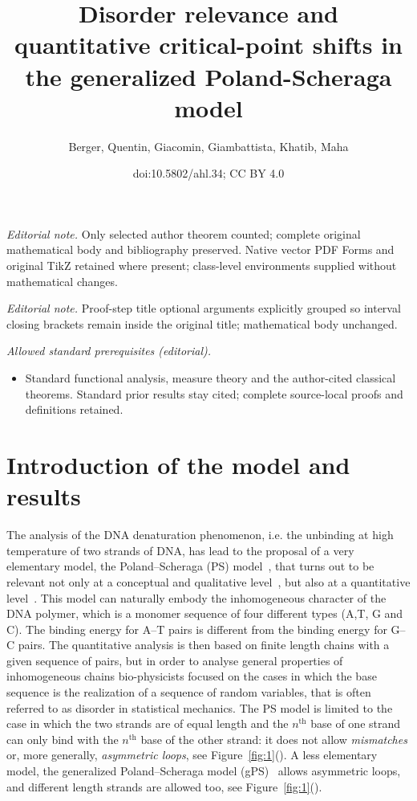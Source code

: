 \documentclass[10pt]{amsart}
\title{Disorder relevance and quantitative critical-point shifts in the generalized Poland-Scheraga model}
\author{Berger, Quentin, Giacomin, Giambattista, Khatib, Maha}
\date{doi:10.5802/ahl.34; CC BY 4.0}
\theoremstyle{definition}\newtheorem{defi}[theo]{Definition}\newtheorem{rema}[theo]{Remark}\newtheorem{exam}[theo]{Example}\newtheorem{exem}[theo]{Example}\newtheorem{nota}[theo]{Notation}
\DeclareMathOperator{\tHt}{th}
\newcommand*\eqsubref[1]{(\subref{#1})} %
\begin{document}
\maketitle
\noindent\textit{Editorial note.} Only selected author theorem counted; complete original mathematical body and bibliography preserved. Native vector PDF Forms and original TikZ retained where present; class-level environments supplied without mathematical changes.\par\medskip
\noindent\textit{Editorial note.} Proof-step title optional arguments explicitly grouped so interval closing brackets remain inside the original title; mathematical body unchanged.\par\medskip
\noindent\textit{Allowed standard prerequisites (editorial).}\begin{itemize}
\item Standard functional analysis, measure theory and the author-cited classical theorems. Standard prior results stay cited; complete source-local proofs and definitions retained.
\end{itemize}\medskip



\section{Introduction of the model and results}

The analysis of the DNA denaturation phenomenon, i.e. the unbinding at high temperature of two strands of DNA, has lead to the proposal of a very elementary model, the Poland--Scheraga (PS) model~\cite{cf:PSbook}, that turns out to be relevant not only at a conceptual and qualitative level~\cite{cf:Fisher,cf:GB}, but also at a quantitative level~\cite{cf:Blake2,cf:Blake1}. This model can naturally embody the inhomogeneous character of the DNA polymer, which is a monomer sequence of four different types (A,T, G and C). The binding energy for A--T pairs is different from the binding energy for G--C pairs. The quantitative analysis is then based on finite length chains with a given sequence of pairs, but in order to analyse general properties of inhomogeneous chains bio-physicists focused on the cases in which the base sequence is the realization of a sequence of random variables, that is often referred to as disorder in statistical mechanics. The PS model is limited to the case in which the two strands are of equal length and the $n^{\tHt}$ base of one strand can only bind with the $n^{\tHt}$ base of the other strand: it does not allow \emph{mismatches} or, more generally, \emph{asymmetric loops}, see Figure~\ref{fig:1}\eqsubref{fig:PS}. A less elementary model, the generalized Poland--Scheraga model (gPS)~\cite{cf:GK} allows asymmetric loops, and different length strands are allowed too, see Figure~\ref{fig:1}\eqsubref{fig:gPS}.
\end{document}
